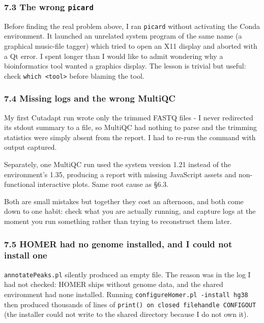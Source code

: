\documentclass[
  11pt,
  a4paper,
]{article}
\begin{document}
\hypertarget{the-wrong-picard}{%
\subsubsection{\texorpdfstring{7.3 The wrong
\texttt{picard}}{7.3 The wrong picard}}\label{the-wrong-picard}}

Before finding the real problem above, I ran \texttt{picard} without
activating the Conda environment. It launched an unrelated system
program of the same name (a graphical music-file tagger) which tried to
open an X11 display and aborted with a Qt error. I spent longer than I
would like to admit wondering why a bioinformatics tool wanted a
graphics display. The lesson is trivial but useful: check
\texttt{which\ \textless{}tool\textgreater{}} before blaming the tool.

\hypertarget{missing-logs-and-the-wrong-multiqc}{%
\subsubsection{7.4 Missing logs and the wrong
MultiQC}\label{missing-logs-and-the-wrong-multiqc}}

My first Cutadapt run wrote only the trimmed FASTQ files - I never
redirected its stdout summary to a file, so MultiQC had nothing to parse
and the trimming statistics were simply absent from the report. I had to
re-run the command with output captured.

Separately, one MultiQC run used the system version 1.21 instead of the
environment's 1.35, producing a report with missing JavaScript assets
and non-functional interactive plots. Same root cause as §6.3.

Both are small mistakes but together they cost an afternoon, and both
come down to one habit: check what you are actually running, and capture
logs at the moment you run something rather than trying to reconstruct
them later.

\hypertarget{homer-had-no-genome-installed-and-i-could-not-install-one}{%
\subsubsection{7.5 HOMER had no genome installed, and I could not
install
one}\label{homer-had-no-genome-installed-and-i-could-not-install-one}}

\texttt{annotatePeaks.pl} silently produced an empty file. The reason
was in the log I had not checked: HOMER ships without genome data, and
the shared environment had none installed. Running
\texttt{configureHomer.pl\ -install\ hg38} then produced thousands of
lines of \texttt{print()\ on\ closed\ filehandle\ CONFIGOUT} (the
installer could not write to the shared directory because I do not own
it).
\end{document}
